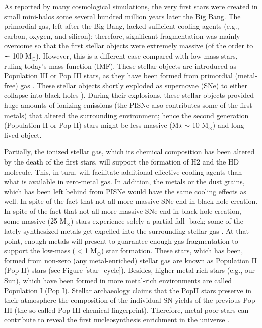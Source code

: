 As reported by many cosmological simulations, the very first stars were created in small mini-halos some several hundred million years later the Big Bang. The primordial gas, left after the Big Bang, lacked sufficient cooling agents (e.g., carbon, oxygen, and silicon); therefore, significant fragmentation was mainly overcome so that the first stellar objects were extremely massive  (of the order to ∼ 100 M$_{\odot}$). However, this is a different case compared with low-mass stars, ruling today’s mass function (IMF). These stellar objects are introduced as Population III or Pop III stars, as they have been formed from primordial (metal-free) gas \citep{1980A&A....83L..10P,1987Natur.326..829C,1988IAUS..126..701H,1990RMxAA..21..322D,2019MNRAS.487.3363W}. These stellar objects shortly exploded as supernovae (SNe) to either collapse into black holes \citep[progenitor masses of 25 $<$ M$_{\odot}$ $<$ 140 and M$_{\odot}$ $>$ 260) or to die as energetic pair-instability SNe (PISN; 140 $<$ M$_{\odot}$ $<$ 260;][]{2002ApJ...567..532H}). During their explosions, these stellar objects provided huge amounts of ionizing emissions (the PISNe also contributes some of the first metals) that altered the surrounding environment; hence the second generation (Population II or Pop II) stars might be less massive (M$\star$ $\sim$ 10 M$_{\odot}$) and long-lived object. 



Partially, the ionized stellar gas, which its chemical composition has been altered by the death of the first stars, will support the formation of H2 and the HD molecule. This, in turn, will facilitate additional effective cooling agents than what is available in zero-metal gas. In addition, the metals or the dust grains, which has been left behind from PISNe would have the same cooling effects as well. In spite of the fact that not all more massive SNe end in black hole creation. In spite of the fact that not all more massive SNe end in black hole creation, some massive (25 M$_{\odot}$) stars experience solely a partial fall- back; some of the lately synthesized metals get expelled into the surrounding stellar gas \citep[e.g.,][]{2003Natur.422..871U}. At that point, enough metals will present to guarantee enough gas fragmentation to support the low-mass ($<$1 M$_{\odot}$) star formation. These stars, which has been, formed from non-zero (any metal-enriched) stellar gas are known as Population II (Pop II) stars (see Figure \ref{star_cycle}). Besides, higher metal-rich stars (e.g., our Sun), which have been formed in more metal-rich environments are called Population I (Pop I). Stellar archaeology claims that the PopII stars preserve in their atmosphere the composition of the individual SN yields of the previous Pop III (the so called Pop III chemical fingerprint). Therefore, metal-poor stars can contribute to reveal the first nucleosynthesis enrichment in the universe \citep{2005ARA&A..43..531B, 2007ApJ...655..492A, 2016A&A...588A..37H, 2016ApJ...829L..24P, 2017MNRAS.471..404K,2017MNRAS.472..350R, 2018MNRAS.475.4781C,2018A&A...614A..68C,2019arXiv190409608M,2019ApJ...875...89M,2019arXiv190608439M}.



